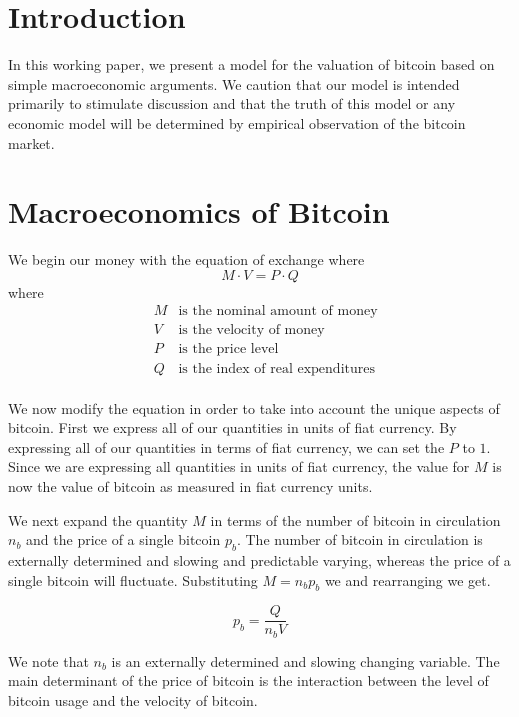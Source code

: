 \documentclass[twoside]{article}
\begin{document}
\begin{multicols}{2}

\section{Introduction} 

In this working paper, we present a model for the valuation of bitcoin
based on simple macroeconomic arguments.  We caution that our model is
intended primarily to stimulate discussion and that the truth of this
model or any economic model will be determined by empirical
observation of the bitcoin market.

\section{Macroeconomics of Bitcoin}

We begin our money with the equation of exchange where
\begin{equation}
M \cdot V = P \cdot Q
\end{equation}
where
\begin{eqnarray*}
& M & \mbox{is the nominal amount of money}\\
& V & \mbox{is the velocity of money}\\
& P & \mbox{is the price level}\\
& Q & \mbox{is the index of real expenditures}\\
\end{eqnarray*}

We now modify the equation in order to take into account the unique
aspects of bitcoin.  First we express all of our quantities in units
of fiat currency.  By expressing all of our quantities in terms of
fiat currency, we can set the $P$ to $1$.  Since we are expressing all
quantities in units of fiat currency, the value for $M$ is now the
value of bitcoin as measured in fiat currency units.

We next expand the quantity $M$ in terms of the number of bitcoin in
circulation $n_b$ and the price of a single bitcoin $p_b$.  The number
of bitcoin in circulation is externally determined and slowing and
predictable varying, whereas the price of a single bitcoin will
fluctuate.  Substituting $M=n_b p_b$ we and rearranging we get.

\begin{equation}
p_b = \frac{Q}{n_b V}
\end{equation}

We note that $n_b$ is an externally determined and slowing changing
variable.  The main determinant of the price of bitcoin is the
interaction between the level of bitcoin usage and the velocity of
bitcoin.


\end{multicols}
\end{document}
